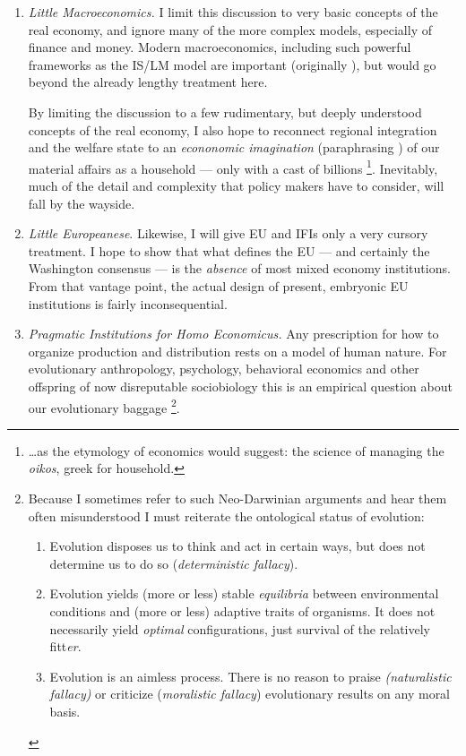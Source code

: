 \documentclass[11pt,a4paper,oneside,openright]{article}
\begin{document}
\begin{enumerate}
	\item \label{it:little_macroeconomics} \emph{Little Macroeconomics.} 
		I limit this discussion to very basic concepts of the real economy, and ignore many of the more complex models, especially of finance and money. 
		Modern macroeconomics, including such powerful frameworks as the IS/LM model are important (originally \citealt{Hicks1937}), but would go beyond the already lengthy treatment here. 

	By limiting the discussion to a few rudimentary, but deeply understood concepts of the real economy, I also hope to reconnect regional integration and the welfare state to an \emph{econonomic imagination} (paraphrasing \citealt{Mills-1959-aa}) of our material affairs as a household --- only with a cast of billions
	\footnote{
		\ldots as the etymology of economics would suggest: 
		the science of managing the \emph{oikos}, greek for household.
	}. 
	Inevitably, much of the detail and complexity that policy makers have to consider, will fall by the wayside. 

	\item \label{it:little_europeanese} \emph{Little Europeanese}. 
		Likewise, I will give \gls{EU} and \glspl{IFI}  only a very cursory treatment. 
		I hope to show that what defines the \gls{EU} --- and certainly the Washington consensus --- is the \emph{absence} of most mixed economy institutions. 
		From that vantage point, the actual design of present, embryonic \gls{EU} institutions is fairly inconsequential.

	\item \label{it:homo_economicus} \emph{Pragmatic Institutions for Homo Economicus.} 
		Any prescription for how to organize production and distribution rests on a model of human nature. 
		For evolutionary anthropology, psychology, behavioral economics and other offspring of now disreputable \citep{Wright1994} sociobiology \citep{Wilson1975} this is an empirical question about our evolutionary baggage
			\footnote{
				Because I sometimes refer to such Neo-Darwinian arguments \citep{Wright1994} and hear them often misunderstood I must reiterate the ontological status of evolution:
				\begin{enumerate}
					\item Evolution disposes us to think and act in certain ways, but does not determine us to do so (\emph{deterministic fallacy}).
					\item Evolution yields (more or less) stable \emph{equilibria} between environmental conditions and (more or less) adaptive traits of organisms. 
					It does not necessarily yield \emph{optimal} configurations, just survival of the relatively fitt\emph{er}. 
					\item Evolution is an aimless process. 
						There is no reason to praise \emph{(naturalistic fallacy)} or criticize (\emph{moralistic fallacy}) evolutionary results on any moral basis.
		\end{enumerate} 
			}.
	

\end{enumerate}
\end{document}
